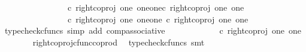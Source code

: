 \begin{isabellebody}
\ \ \isamarkupfalse%
{\isacharminus}{\kern0pt}\ \isanewline
\ \ \ \ \isamarkupfalse%
\ {\isachardoublequoteopen}{\isasymlangle}{\isasymf}{\isacharcomma}{\kern0pt}\ {\isasymf}{\isasymrangle}\ {\isasymamalg}\ {\isasymlangle}{\isasymt}{\isacharcomma}{\kern0pt}{\isasymf}{\isasymrangle}\ {\isasymamalg}\ {\isasymlangle}{\isasymf}{\isacharcomma}{\kern0pt}{\isasymt}{\isasymrangle}\ {\isasymcirc}\isactrlsub c\ {\isacharparenleft}{\kern0pt}right{\isacharunderscore}{\kern0pt}coproj\ one\ {\isacharparenleft}{\kern0pt}one{\isasymCoprod}one{\isacharparenright}{\kern0pt}{\isasymcirc}\isactrlsub c\ right{\isacharunderscore}{\kern0pt}coproj\ one\ one{\isacharparenright}{\kern0pt}\ {\isacharequal}{\kern0pt}\ \isanewline
\ \ \ \ \ \ \ \ \ \ {\isacharparenleft}{\kern0pt}{\isasymlangle}{\isasymf}{\isacharcomma}{\kern0pt}\ {\isasymf}{\isasymrangle}\ {\isasymamalg}\ {\isasymlangle}{\isasymt}{\isacharcomma}{\kern0pt}{\isasymf}{\isasymrangle}\ {\isasymamalg}\ {\isasymlangle}{\isasymf}{\isacharcomma}{\kern0pt}{\isasymt}{\isasymrangle}\ {\isasymcirc}\isactrlsub c\ right{\isacharunderscore}{\kern0pt}coproj\ one\ {\isacharparenleft}{\kern0pt}one{\isasymCoprod}one{\isacharparenright}{\kern0pt}\ {\isacharparenright}{\kern0pt}{\isasymcirc}\isactrlsub c\ right{\isacharunderscore}{\kern0pt}coproj\ one\ one{\isachardoublequoteclose}\isanewline
\ \ \ \ \ \ \isamarkupfalse%
\ {\isacharparenleft}{\kern0pt}typecheck{\isacharunderscore}{\kern0pt}cfuncs{\isacharcomma}{\kern0pt}\ simp\ add{\isacharcolon}{\kern0pt}\ comp{\isacharunderscore}{\kern0pt}associative{}{\isacharparenright}{\kern0pt}\isanewline
\ \ \ \ \isamarkupfalse%
\ \isamarkupfalse%
\ {\isachardoublequoteopen}{\isachardot}{\kern0pt}{\isachardot}{\kern0pt}{\isachardot}{\kern0pt}\ {\isacharequal}{\kern0pt}\ {\isasymlangle}{\isasymt}{\isacharcomma}{\kern0pt}{\isasymf}{\isasymrangle}\ {\isasymamalg}\ {\isasymlangle}{\isasymf}{\isacharcomma}{\kern0pt}{\isasymt}{\isasymrangle}\ {\isasymcirc}\isactrlsub c\ right{\isacharunderscore}{\kern0pt}coproj\ one\ one{\isachardoublequoteclose}\isanewline
\ \ \ \ \ \ \isamarkupfalse%
\ right{\isacharunderscore}{\kern0pt}coproj{\isacharunderscore}{\kern0pt}cfunc{\isacharunderscore}{\kern0pt}coprod\ \isamarkupfalse%
\ {\isacharparenleft}{\kern0pt}typecheck{\isacharunderscore}{\kern0pt}cfuncs{\isacharcomma}{\kern0pt}\ smt{\isacharparenright}{\kern0pt}\isanewline
\ \ \ \ \isamarkupfalse%
\ \isamarkupfalse%
\ {\isachardoublequoteopen}{\isachardot}{\kern0pt}{\isachardot}{\kern0pt}{\isachardot}{\kern0pt}\ {\isacharequal}{\kern0pt}\ {\isasymlangle}{\isasymf}{\isacharcomma}{\kern0pt}{\isasymt}{\isasymrangle}{\isachardoublequoteclose}\isanewline

\end{isabellebody}

